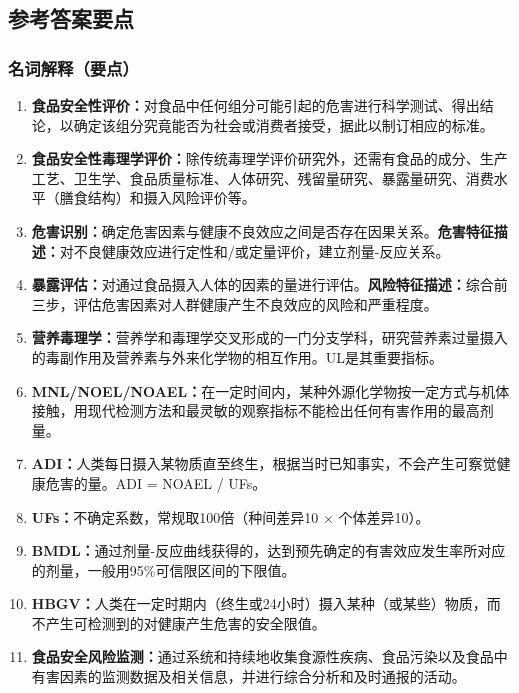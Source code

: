 {\subsection*{参考答案要点}

\subsubsection*{名词解释（要点）}

\begin{enumerate}[leftmargin=*, itemsep=4pt]
    \item \textbf{食品安全性评价：}对食品中任何组分可能引起的危害进行科学测试、得出结论，以确定该组分究竟能否为社会或消费者接受，据此以制订相应的标准。
    \item \textbf{食品安全性毒理学评价：}除传统毒理学评价研究外，还需有食品的成分、生产工艺、卫生学、食品质量标准、人体研究、残留量研究、暴露量研究、消费水平（膳食结构）和摄入风险评价等。
    \item \textbf{危害识别：}确定危害因素与健康不良效应之间是否存在因果关系。\textbf{危害特征描述：}对不良健康效应进行定性和/或定量评价，建立剂量-反应关系。
    \item \textbf{暴露评估：}对通过食品摄入人体的因素的量进行评估。\textbf{风险特征描述：}综合前三步，评估危害因素对人群健康产生不良效应的风险和严重程度。
    \item \textbf{营养毒理学：}营养学和毒理学交叉形成的一门分支学科，研究营养素过量摄入的毒副作用及营养素与外来化学物的相互作用。UL是其重要指标。
    \item \textbf{MNL/NOEL/NOAEL：}在一定时间内，某种外源化学物按一定方式与机体接触，用现代检测方法和最灵敏的观察指标不能检出任何有害作用的最高剂量。
    \item \textbf{ADI：}人类每日摄入某物质直至终生，根据当时已知事实，不会产生可察觉健康危害的量。ADI = NOAEL / UFs。
    \item \textbf{UFs：}不确定系数，常规取100倍（种间差异10 $\times$ 个体差异10）。
    \item \textbf{BMDL：}通过剂量-反应曲线获得的，达到预先确定的有害效应发生率所对应的剂量，一般用95\%可信限区间的下限值。
    \item \textbf{HBGV：}人类在一定时期内（终生或24小时）摄入某种（或某些）物质，而不产生可检测到的对健康产生危害的安全限值。
    \item \textbf{食品安全风险监测：}通过系统和持续地收集食源性疾病、食品污染以及食品中有害因素的监测数据及相关信息，并进行综合分析和及时通报的活动。
\end{enumerate}

}
